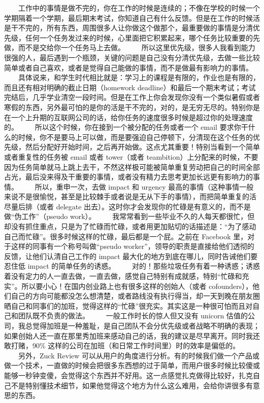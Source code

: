 \documentclass[11pt]{ctexart}
\begin{document}
　　工作中的事情是做不完的，你在工作的时候是连续的；不像在学校的时候一个学期隔着一个学期，最后期末考试，你知道自己有什么反馈。但是在工作的时候活是干不完的，所有东西，周围很多人让你做这个做那个，最重要做的事情是分清优先级，任何一个任务发过来的时候，心里面把它积累起来，哪个任务比较重要的先做，而不是交给你一个任务马上去做。
　　所以这里优先级，很多人我看到能力很强的人，最后遇到一个瓶颈，关键的问题是自己没有分清优先级，去做一些比较简单或者自己喜欢，或者是觉得自己能做的事情，而不是做最有影响力的事情。
　　具体说来，和学生时代相比就是：学习上的课程是有限的，作业也是有限的，而且还有相对明确的截止日期（homework deadline）和最后一个期末考试；考试完结后，几乎学业清空一段时间。但是在工作上你会发现你没有一个类似暑假或者寒假的东西，另外最可怕的是你的活是干不完的，对的，是无穷无尽的。特别你是在一个上升期的互联网公司的话，给你任务的速度很多时候是超过你的处理速度的。
　　所以这个时候，你在接到一个被分配的任务或者一个 email 要求你干什么的时候，你不是要马上可以做，而是要强迫自己停顿下，分清现在这个任务的优先级，然后分配好开始时间，之后再开始做。这点尤其重要！特别当看到一个简单或者重复性的任务被 email 或者 tower（或者 teambition）上分配来的时候，不要因为任务简单就马上跳上去干，不然这样极可能被简单重复劳动把自己的时间全部占光，最后没来得及干重要的事情，或者没有精力去思考更加长远更有影响力的事情。
　　所以，重申一次，去做 impact 和 urgency 最高的事情（这种事情一般来说不是很愉悦，甚至是比较棘手或者说是无从下手的事情），而把简单重复的活尽量后排（或者 delegate 出去）。这时你才会发现你的忙碌是有意义的，而不是做“伪工作”（pseudo work）。
　　我常常看到一些毕业不久的人每天都很忙，但却没有抓住重点，只是为了忙碌而忙碌，或者用更加贴切的话描述是：“为了感动自己而忙碌”。很多时候这样的忙碌，最后都是一个屁。之前在 Facebook 里，对于这样的同事有一个称号叫做“pseudo worker”，领导的职责是直接给他们透彻的反馈，让他们认清自己工作的 impact 最大化的地方到底在哪儿，同时告诫他们要忍住低 impact 的简单任务的诱惑。
　　对的！那些垃圾任务有着一种诱惑；诱惑着没有定力的人一直去做，一直去做，感觉自己特别有成就感，特别“忙碌和充实”。所以要小心！在国内创业路上也有很多这样的创始人（或者 cofounders），他们自己的方向可能都没怎么想清楚，或者路线没有执行得当，却一天到晚在朋友圈晒自己和同事们的加班，觉得这样的“忙碌”很充实。其实这是一种很可怕而且对自己和团队既不负责的做法。
　　一般工作时长的惊人但又没有 unicorn 估值的公司，我总觉得加班是一种羞耻，是自己团队不会分优先级或者战略不明确的表现；如果创始人还一直在那里秀加班来感动自己的话，我的建议是尽早离开。同时我还敢打赌，90\% 这样的公司在加班（和日常工作时间里）时的效率是偏低的。
　　另外，Zuck Review 可以从用户的角度进行分析。有的时候我们做一个产品或做一个技术，一直做的时候会把很多东西想的过于简单，而用户很多时候比较傻或能够一秒钟变傻，会觉得这个东西并不好用。这一点感觉扎克做得比较好，扎克自己不是特别懂技术细节，如果他觉得这个地方为什么这么难用，会给你讲很多有意思的东西。
　
\end{document}
